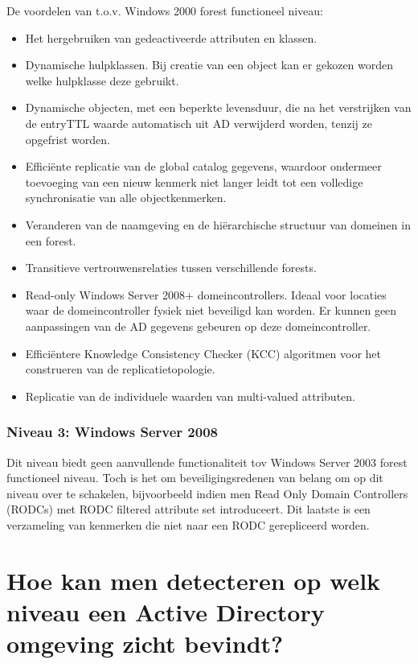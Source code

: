 De voordelen van t.o.v. Windows 2000 forest functioneel niveau:
\begin{itemize}
	\item Het hergebruiken van gedeactiveerde attributen en klassen.
	\item Dynamische hulpklassen. Bij creatie van een object kan er gekozen
		worden welke hulpklasse deze gebruikt.
	\item Dynamische objecten, met een beperkte levensduur, die na het
		verstrijken van de entryTTL waarde automatisch uit AD verwijderd
		worden, tenzij ze opgefrist worden.
	\item Efficiënte replicatie van de global catalog gegevens, waardoor
		ondermeer toevoeging van een nieuw kenmerk niet langer leidt tot
		een volledige synchronisatie van alle objectkenmerken.
	\item Veranderen van de naamgeving en de hiërarchische structuur van
		domeinen in een forest.
	\item Transitieve vertrouwensrelaties tussen verschillende forests.
	\item Read-only Windows Server 2008+ domeincontrollers. Ideaal voor
		locaties waar de domeincontroller fysiek niet beveiligd kan
		worden. Er kunnen geen aanpassingen van de AD gegevens gebeuren
		op deze domeincontroller.
	\item Efficiëntere Knowledge Consistency Checker (KCC) algoritmen voor het construeren van de
		replicatietopologie.
	\item Replicatie van de individuele waarden van multi-valued attributen.
\end{itemize}

\subsubsection{Niveau 3: Windows Server 2008}

Dit niveau biedt geen aanvullende functionaliteit tov Windows Server 2003 forest
functioneel niveau. Toch is het om beveiligingsredenen van belang om op dit
niveau over te schakelen, bijvoorbeeld indien men Read Only Domain Controllers
(RODCs) met RODC filtered attribute set introduceert. Dit laatste is een
verzameling van kenmerken die niet naar een RODC gerepliceerd worden.

\section{Hoe kan men detecteren op welk niveau een Active Directory omgeving
zicht bevindt?}

